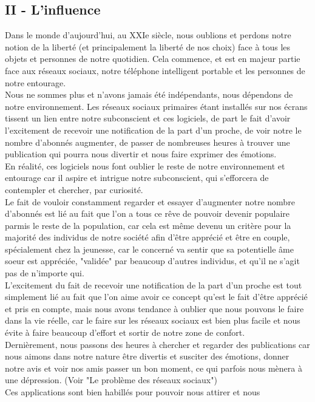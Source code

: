 \documentclass[twocolumn, french]{article}
\begin{document}
\subsection*{II - L'influence}
Dans le monde d'aujourd'hui, au XXIe siècle, nous oublions et perdons notre notion de la 
liberté (et principalement la liberté de nos choix) face à tous les objets et personnes de notre 
quotidien. Cela commence, et est en majeur partie face aux réseaux sociaux, notre téléphone 
intelligent portable et les personnes de notre entourage. \\
Nous ne sommes plus et n'avons jamais été indépendants, nous dépendons de notre environnement.
Les réseaux sociaux primaires étant installés sur nos écrans tissent un lien entre notre 
subconscient et ces logiciels, de part le fait d'avoir l'excitement de recevoir une 
notification de la part d'un proche, de voir notre le nombre d'abonnés augmenter, de passer de 
nombreuses heures à trouver une publication qui pourra nous divertir et nous faire exprimer
des émotions.  \\
En réalité, ces logiciels nous font oublier le reste de notre environnement et entourage car il 
aspire et intrigue notre subconscient, qui s'efforcera de contempler et chercher, par curiosité.
\\ Le fait de vouloir constamment regarder et essayer d'augmenter notre nombre d'abonnés est lié au
fait que l'on a tous ce rêve de pouvoir devenir populaire parmis le reste de la population, car cela 
est même devenu un critère pour la majorité des individus de notre société afin d'être apprécié et être 
en couple, spécialement chez la jeunesse, car le concerné va sentir que sa potentielle âme soeur
est appréciée, "validée" par beaucoup d'autres individus, et qu'il ne s'agit pas de n'importe qui.
\\ L'excitement du fait de recevoir une notification de la part d'un proche est tout simplement lié 
au fait que l'on aime avoir ce concept qu'est le fait d'être apprécié et pris en compte, mais nous 
avons tendance à oublier que nous pouvons le faire dans la vie réelle, car le faire sur les 
réseaux sociaux est bien plus facile et nous évite à faire beaucoup d'effort et sortir de notre 
zone de confort. \\ Dernièrement, nous passons des heures à chercher et regarder des publications 
car nous aimons dans notre nature être divertis et susciter des émotions, donner notre avis et voir 
nos amis passer un bon moment, ce qui parfois nous mènera à une dépression. (Voir "Le problème 
des réseaux sociaux") \\ Ces applications sont bien habillés pour pouvoir nous attirer et nous 
\end{document}
